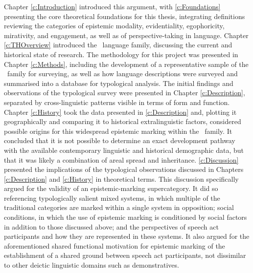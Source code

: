 Chapter \ref{c:Introduction} introduced this argument, with \cref{c:Foundations} presenting the core theoretical foundations for this thesis, integrating definitions reviewing the categories of epistemic modality, evidentiality, egophoricity, mirativity, and engagement, as well as of perspective-taking in language. Chapter \ref{c:THOverview} introduced the \lfam\ language family, discussing the current and historical state of research. The methodology for this project was presented in Chapter \ref{c:Methods}, including the development of a representative sample of the \lfam\ family for surveying, as well as how language descriptions were surveyed and summarised into a database for typological analysis. The initial findings and observations of the typological survey were presented in Chapter \ref{c:Description}, separated by cross-linguistic patterns visible in terms of form and function. Chapter \ref{c:History} took the data presented in \cref{c:Description} and, plotting it geographically and comparing it to historical extralinguistic factors, considered possible origins for this widespread epistemic marking within the \lfam\ family. It concluded that it is not possible to determine an exact development pathway with the available contemporary linguistic and historical demographic data, but that it was likely a combination of areal spread and inheritance. \cref{c:Discussion} presented the implications of the typological observations discussed in Chapters \ref{c:Description} and \ref{c:History} in theoretical terms. This discussion specifically argued for the validity of an epistemic-marking supercategory. It did so referencing typologically salient mixed systems, in which multiple of the traditional categories are marked within a single system in opposition; social conditions, in which the use of epistemic marking is conditioned by social factors in addition to those discussed above; and the perspectives of speech act participants and how they are represented in these systems. It also argued for the aforementioned shared functional motivation for epistemic marking of the establishment of a shared ground between speech act participants, not dissimilar to other deictic linguistic domains such as demonstratives. 

